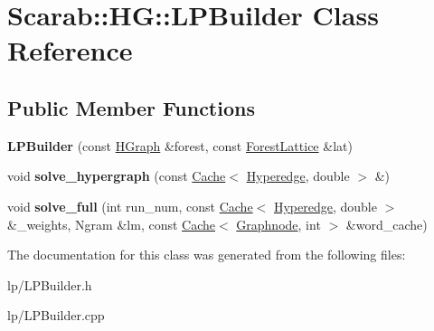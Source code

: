 \hypertarget{classScarab_1_1HG_1_1LPBuilder}{
\section{Scarab::HG::LPBuilder Class Reference}
\label{classScarab_1_1HG_1_1LPBuilder}
}
\subsection*{Public Member Functions}
\begin{DoxyCompactItemize}
\item 
\hypertarget{classScarab_1_1HG_1_1LPBuilder_aba798e4d3faf87e8411607f9d974fc7f}{
{\bfseries LPBuilder} (const \hyperlink{classScarab_1_1HG_1_1HGraph}{HGraph} \&forest, const \hyperlink{classForestLattice}{ForestLattice} \&lat)}
\label{classScarab_1_1HG_1_1LPBuilder_aba798e4d3faf87e8411607f9d974fc7f}

\item 
\hypertarget{classScarab_1_1HG_1_1LPBuilder_abfa755f4c94dc432c022be35861a8200}{
void {\bfseries solve\_\-hypergraph} (const \hyperlink{classCache}{Cache}$<$ \hyperlink{classScarab_1_1HG_1_1Hyperedge}{Hyperedge}, double $>$ \&)}
\label{classScarab_1_1HG_1_1LPBuilder_abfa755f4c94dc432c022be35861a8200}

\item 
\hypertarget{classScarab_1_1HG_1_1LPBuilder_a963bdf9c956b4a08d52be06e1cb6a05a}{
void {\bfseries solve\_\-full} (int run\_\-num, const \hyperlink{classCache}{Cache}$<$ \hyperlink{classScarab_1_1HG_1_1Hyperedge}{Hyperedge}, double $>$ \&\_\-weights, Ngram \&lm, const \hyperlink{classCache}{Cache}$<$ \hyperlink{classScarab_1_1Graph_1_1Graphnode}{Graphnode}, int $>$ \&word\_\-cache)}
\label{classScarab_1_1HG_1_1LPBuilder_a963bdf9c956b4a08d52be06e1cb6a05a}

\end{DoxyCompactItemize}


The documentation for this class was generated from the following files:\begin{DoxyCompactItemize}
\item 
lp/LPBuilder.h\item 
lp/LPBuilder.cpp\end{DoxyCompactItemize}
